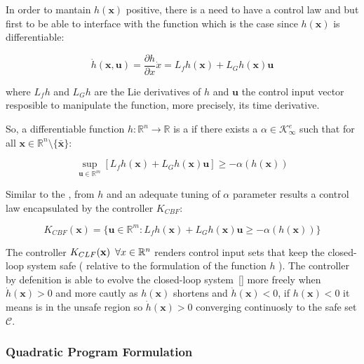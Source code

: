 In order to mantain \(h( \mathbf{x} )\) positive, there is a need to have a control law and but first to be able to interface with the function which is the case since \(h( \mathbf{x} )\) is differentiable:  

\[\dot{h}(\mathbf{x}, \mathbf{u}) = \frac{\partial h}{\partial x}\dot{x} = L_fh(\mathbf{x}) + L_Gh(\mathbf{x})\mathbf{u} \]

where \(L_fh\) and \(L_Gh\) are the Lie derivatives of \(h\) and \(\mathbf{u}\) the control input vector resposible to manipulate the function, more precisely, its time derivative.\par

So, a differentiable function \( h: \mathbb{R}^n \rightarrow \mathbb{R}  \) is a  if there exists a \( \alpha \in \mathcal{K}^e_{\infty}  \) such that for all \( \mathbf{x} \in \mathbb{R}^n \setminus \{\bar{\mathbf{x}}\} \):

\begin{equation}
 \sup_{\mathbf{u} \in \mathbb{R}^m} [L_fh(\mathbf{x}) + L_Gh(\mathbf{x})\mathbf{u}] \geq -\alpha(h( \mathbf{x} ))
 \label{eq:CBF}
\end{equation}

Similar to the , from  \(h\) and an adequate tuning of \( \alpha \) parameter results a control law encapsulated by the controller \(K_{CBF}\):

\begin{equation}
 K_{CBF}(\mathbf{x}) = \{ \mathbf{u} \in \mathbb{R}^m: L_fh(\mathbf{x}) + L_Gh(\mathbf{x})\mathbf{u} \geq -\alpha(h( \mathbf{x} )) \}
 \label{eq:K-CBF}
\end{equation}


The controller \(K_{CLF}(\mathbf{x}) \hspace{0.5em} \forall x \in \mathbb{R}^n \) renders control input sets that keep the closed-loop system safe ( relative to the formulation of the function \(h\) ). The controller by defenition is able to evolve the closed-loop system~\ref{} more freely when \(\dot{h}( \mathbf{x} ) > 0\) and more cautly as \(h( \mathbf{x} ) \) shortens and \(\dot{h}( \mathbf{x} ) < 0\), if \(h( \mathbf{x} ) < 0\) it means is in the unsafe region so \(\dot{h}( \mathbf{x}) > 0\) converging continuosly to the safe set \(\mathcal{C}\). 




\subsubsection{Quadratic Program Formulation}
\label{subsub:quadratic_program_formulation}

